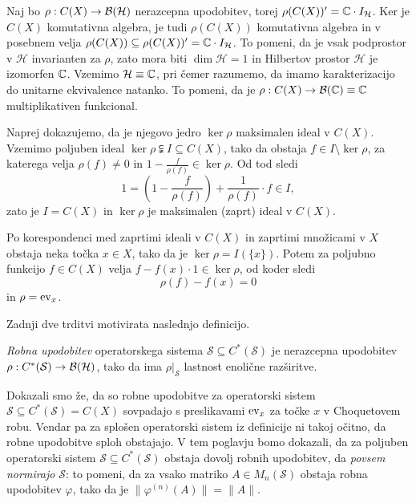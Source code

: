 \begin{dokaz}
    Naj bo $\rho: C(X) \to \operatorname{\mathcal{B} (\mathcal{H})}$ nerazcepna upodobitev, torej $\rho(C(X))' = \mathbb C \cdot I_{\mathcal{H}}$.
    Ker je $C(X)$ komutativna algebra, je tudi $\rho(C(X))$ komutativna algebra in v posebnem velja 
    $\rho(C(X)) \subseteq \rho(C(X))' = \mathbb C \cdot I_{\mathcal{H}}$. To pomeni, da je vsak podprostor v $\mathcal{H}$
    invarianten za $\rho$, zato mora biti $\dim \mathcal{H} = 1$ in Hilbertov prostor $\mathcal{H}$ je izomorfen $\mathbb C$.
    Vzemimo $\mathcal{H} \equiv \mathbb C$, pri čemer razumemo, da imamo karakterizacijo do unitarne ekvivalence natanko.
    To pomeni, da je $\rho: C(X) \to \mathcal{B}(\mathbb C) \equiv \mathbb C$ multiplikativen funkcional.

    Naprej dokazujemo, da je njegovo jedro $\ker \rho$ maksimalen ideal v $C(X)$. Vzemimo poljuben ideal $\ker \rho \subsetneqq I \subseteq C(X)$,
    tako da obstaja $f \in I \setminus \ker \rho$, za katerega velja $\rho(f) \neq 0$ in $1 - \frac{f}{\rho(f)} \in \ker \rho$.
    Od tod sledi $$1 = \left(1 - \frac{f}{\rho(f)}\right) + \frac{1}{\rho(f)} \cdot f \in I,$$
    zato je $I = C(X)$ in $\ker \rho$ je maksimalen (zaprt) ideal v $C(X)$.
    
    Po korespondenci med zaprtimi ideali v $C(X)$ in zaprtimi množicami v $X$ obstaja neka točka $x \in X$,
    tako da je $\ker \rho = I(\{x\})$. Potem za poljubno funkcijo $f \in C(X)$ velja
    $f - f(x) \cdot 1 \in \ker \rho$, od koder sledi 
    $$\rho(f) - f(x) = 0$$
    in $\rho = \operatorname{ev}_x$.
\end{dokaz}

Zadnji dve trditvi motivirata naslednjo definicijo.

\begin{definicija}
    \emph{Robna upodobitev} operatorskega sistema $\mathcal{S} \subseteq C^*(\mathcal{S})$ je nerazcepna upodobitev $\rho: C^*(\mathcal{S}) \to \operatorname{\mathcal{B} (\mathcal{H})}$,
    tako da ima $\rho|_{\mathcal{S}}$ lastnost enolične razširitve.
\end{definicija}

Dokazali smo že, da so robne upodobitve za operatorski sistem $\mathcal{S} \subseteq C^*(\mathcal{S}) = C(X)$
sovpadajo s preslikavami $\operatorname{ev}_x$ za točke $x$ v Choquetovem robu. Vendar pa za splošen operatorski sistem
iz definicije ni takoj očitno, da robne upodobitve sploh obstajajo. V tem poglavju bomo dokazali, da za poljuben operatorski sistem $\mathcal{S} \subseteq C^*(\mathcal{S})$
obstaja dovolj robnih upodobitev, da \emph{povsem normirajo} $\mathcal{S}$: to pomeni,
da za vsako matriko $A \in M_n (\mathcal{S})$ obstaja robna upodobitev $\varphi$, tako da je $\| \varphi^{(n)} (A)\| = \| A\|$.

